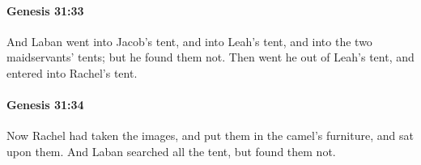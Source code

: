 		\paragraph{Genesis 31:33} %
			\label{GENESIS-31-33}

			And Laban went into Jacob's tent, and into Leah's tent, and into the two maidservants' tents; but he found them not. Then went he out of Leah's tent, and entered into Rachel's tent.


		\paragraph{Genesis 31:34} %
			\label{GENESIS-31-34}

			Now Rachel had taken the images, and put them in the camel's furniture, and sat upon them. And Laban searched all the tent, but found them not.


